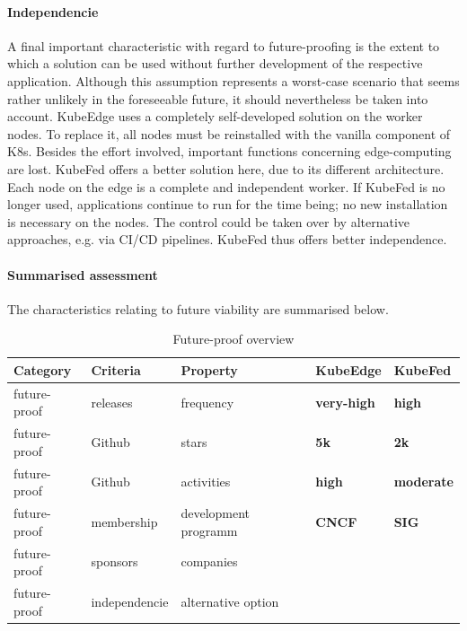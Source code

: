 \documentclass[MSC,Master,english]{twbook}%
\newcommand{\cmark}{\ding{51}}%
\newcommand{\xmark}{\ding{55}}%
\begin{document}
\paragraph{Independencie} A final important characteristic with regard to future-proofing is the extent to which a solution can be used without further development of the respective application. Although this assumption represents a worst-case scenario that seems rather unlikely in the foreseeable future, it should nevertheless be taken into account. KubeEdge uses a completely self-developed solution on the worker nodes. To replace it, all nodes must be reinstalled with the vanilla component of \ac{K8s}. Besides the effort involved, important functions concerning edge-computing are lost. \ac{KubeFed} offers a better solution here, due to its different architecture. Each node on the edge is a complete and independent worker. If KubeFed is no longer used, applications continue to run for the time being; no new installation is necessary on the nodes. The control could be taken over by alternative approaches, e.g. via \ac{CI/CD} pipelines. KubeFed thus offers better independence.

\paragraph{Summarised assessment} The characteristics relating to future viability are summarised below.  
\begin{table}[ht]
    \begin{center}
        \begin{tabular}{|l|l|l|l|l|}
            \hline
            Category & Criteria & Property & \textbf{KubeEdge} & \textbf{KubeFed} \\
            \hline
            future-proof & releases  & frequency & \textbf{very-high} & \textbf{high} \\
            future-proof & Github  & stars & \textbf{5k} & \textbf{2k} \\
            future-proof & Github & activities & \textbf{high} & \textbf{moderate} \\
            future-proof & membership & development programm & \textbf{CNCF} & \textbf{SIG} \\
            future-proof & sponsors & companies & \cmark & \xmark \\
            future-proof & independencie & alternative option & \xmark & \cmark \\
            \hline
        \end{tabular}
        \caption{Future-proof overview}
        \label{tab:fp-overview}
    \end{center}
\end{table}
\end{document}
